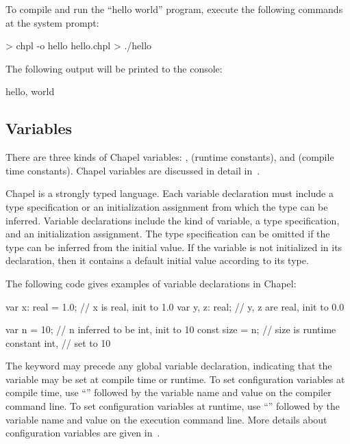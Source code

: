 To compile and run the ``hello world'' program, execute the following
commands at the system prompt:
\begin{commandline} 
> chpl -o hello hello.chpl
> ./hello
\end{commandline}
The following output will be printed to the console:
\begin{commandline}
hello, world
\end{commandline}

\subsection{Variables}

There are three kinds of Chapel variables: ,
 (runtime constants), and  (compile time constants).
Chapel variables are discussed in detail in~.

Chapel is a strongly typed language.  Each variable declaration must
include a type specification or an initialization assignment from
which the type can be inferred.  Variable declarations include the
kind of variable, a type specification, and an initialization
assignment.  The type specification can be omitted if the type can be
inferred from the initial value.  If the variable is not initialized
in its declaration, then it contains a default initial value according
to its type.

\begin{example}
The following code gives examples of variable declarations in Chapel:
\begin{chapel}
var x: real = 1.0; // x is real, init to 1.0
var y, z: real;    // y, z are real, init to 0.0

var n = 10; // n inferred to be int, init to 10
const size = n; // size is runtime constant int,
                // set to 10
\end{chapel}
\end{example}

The keyword  may precede any global variable declaration,
indicating that the variable may be set at compile time or runtime.
To set configuration variables at compile time, use ``''
followed by the variable name and value on the compiler command line.
To set configuration variables at runtime, use ``\chpl{--}'' followed
by the variable name and value on the execution command line.  More
details about configuration variables are given
in~.

